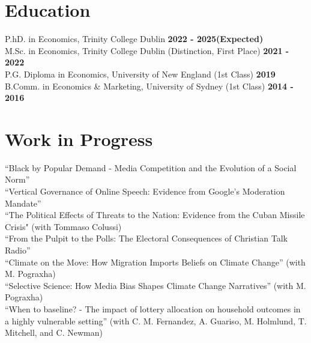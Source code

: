 \documentclass{resume}
\begin{document}
\section{Education} 
\begin{content}
    {P.hD. in Economics, Trinity College Dublin} \hfill {\bf 2022 - 2025(Expected)} \\
    {M.Sc. in Economics, Trinity College Dublin (Distinction, First Place)} \hfill {\bf 2021 - 2022} \\
    {P.G. Diploma in Economics, University of New England (1st Class)} \hfill {\bf 2019} \\
    {B.Comm. in Economics \& Marketing, University of Sydney (1st Class)} \hfill {\bf 2014 - 2016} \\
\sectionlineskip
\end{content}
\vspace{-3\medskipamount}

\section{Work in Progress}
\begin{content}
	{``Black by Popular Demand - Media Competition and the Evolution of a Social Norm''}\\
	{``Vertical Governance of Online Speech: Evidence from Google’s Moderation Mandate''}\\
	{``The Political Effects of Threats to the Nation: Evidence from the Cuban Missile Crisis" (with Tommaso Colussi)}\\
	{``From the Pulpit to the Polls: The Electoral Consequences of Christian Talk Radio''}\\
	{``Climate on the Move: How Migration Imports Beliefs on Climate Change'' (with M. Pograxha)}\\
	{``Selective Science: How Media Bias Shapes Climate Change Narratives'' (with M. Pograxha)}\\
	{``When to baseline? - The impact of lottery allocation on household outcomes in a highly vulnerable setting'' (with C. M. Fernandez, A. Guariso, M. Holmlund, T. Mitchell, and C. Newman)}\\
\sectionlineskip
\end{content}
\vspace{-3\medskipamount}

\end{document}
